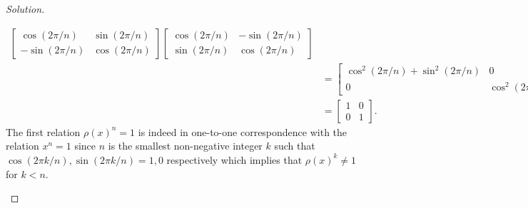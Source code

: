 \begin{proof}[Solution]
\begin{enumerate}[font=\normalfont,label=\textbf{(\alph*)}, wide]
\[\begin{aligned}
\begin{bmatrix}
\cos(2\pi/n) & \sin(2\pi/n) \\
-\sin(2\pi/n) & \cos(2\pi/n)
\end{bmatrix}
\begin{bmatrix}
\cos(2\pi/n) & -\sin(2\pi/n) \\
\sin(2\pi/n) & \cos(2\pi/n)
\end{bmatrix}
\\
&=
\begin{bmatrix}
\cos^2(2\pi/n) + \sin^2(2\pi/n) & 0 \\
0 & \cos^2(2\pi/n) + \sin^2(2\pi/n)
\end{bmatrix}
\\
&=
\begin{bmatrix}
1 & 0 \\
0 & 1
\end{bmatrix}
.
\end{aligned}
\]
The first relation $\rho(x)^n = 1$ is indeed in one-to-one correspondence with the relation $x^n = 1$ since $n$ is the smallest non-negative integer $k$ such that $\cos(2\pi k/n), \sin(2\pi k/n) = 1, 0$ respectively which implies that $\rho(x)^k \neq 1$ for $k < n$.


\end{enumerate}
\end{proof}
